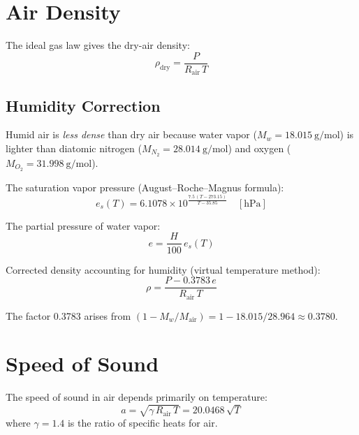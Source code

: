 \documentclass[11pt,twoside,openright]{report}
\begin{document}
\section{Air Density}

The ideal gas law gives the dry-air density:
\begin{equation}
  \rho_{\mathrm{dry}} = \frac{P}{R_{\mathrm{air}} \, T}
  \label{eq:rho_dry}
\end{equation}

\subsection{Humidity Correction}

Humid air is \emph{less dense} than dry air because water vapor ($M_{w}=\SI{18.015}{\gram\per\mole}$) is lighter than diatomic nitrogen ($M_{N_2}=\SI{28.014}{\gram\per\mole}$) and oxygen ($M_{O_2}=\SI{31.998}{\gram\per\mole}$).

The saturation vapor pressure (August--Roche--Magnus formula):
\begin{equation}
  e_s(T) = 6.1078 \times 10^{\frac{7.5\,(T - 273.15)}{T - 35.85}} \quad [\text{hPa}]
  \label{eq:sat_vapor}
\end{equation}

The partial pressure of water vapor:
\begin{equation}
  e = \frac{H}{100}\, e_s(T)
  \label{eq:vapor_pressure}
\end{equation}

Corrected density accounting for humidity (virtual temperature method):
\begin{equation}
  \rho = \frac{P - 0.3783\,e}{R_{\mathrm{air}}\,T}
  \label{eq:rho_humid}
\end{equation}

The factor 0.3783 arises from $(1 - M_w/M_{\mathrm{air}}) = 1 - 18.015/28.964 \approx 0.3780$.

\section{Speed of Sound}

The speed of sound in air depends primarily on temperature:
\begin{equation}
  a = \sqrt{\gamma \, R_{\mathrm{air}} \, T} = 20.0468\,\sqrt{T}
  \label{eq:speed_of_sound}
\end{equation}
where $\gamma = 1.4$ is the ratio of specific heats for air.
\end{document}
